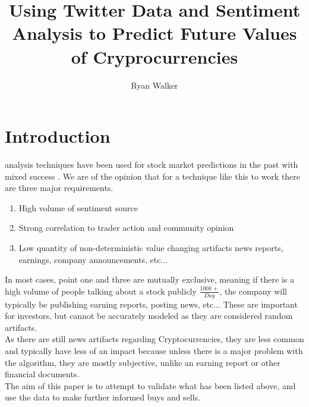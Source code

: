 \documentclass[12pt,journal,compsoc]{IEEEtran}
\begin{document}
\title{Using Twitter Data and Sentiment Analysis to Predict Future Values of Cryprocurrencies}

\author{Ryan Walker}


\maketitle
\IEEEpeerreviewmaketitle

\section{Introduction}
 analysis techniques have been used for stock market predictions in the past  with 
mixed success \cite{BI1}. We are of the opinion that for a technique like this to work there are three major requirements.

\begin{enumerate}
\item High volume of sentiment source
\item Strong correlation to trader action and community opinion
\item Low quantity of non-deterministic value changing artifacts news reports, earnings, company announcements, etc...
\end{enumerate}

In most cases, point one and three are mutually exclusive, meaning if there is a high volume of people talking about a
stock publicly $\frac{100k+}{Day}$, the company will typically be publishing earning reports, posting news, etc... 
These are important for investors, but cannot be accurately modeled as they are considered random artifacts.\\

As there are still news artifacts regarding Cryptocurrencies, they are less common and typically 
have less of an impact because unless there is a major problem with the algorithm, they are mostly subjective, unlike 
an earning report or other financial documents.\\

The aim of this paper is to attempt to validate what has been listed above, and use the data to make further informed 
buys and sells.
\end{document}

